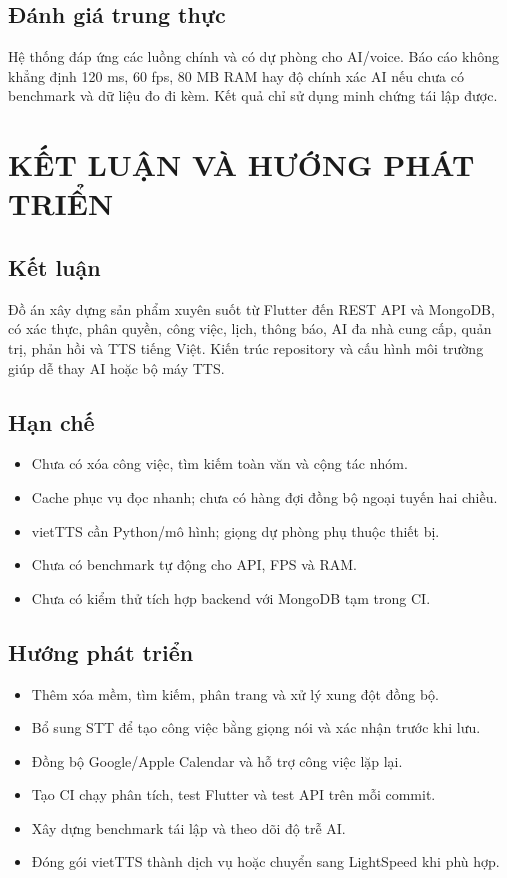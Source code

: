 \documentclass[12pt,a4paper,oneside]{report}
\begin{document}
\section{Đánh giá trung thực}
Hệ thống đáp ứng các luồng chính và có dự phòng cho AI/voice. Báo cáo không khẳng
định 120 ms, 60 fps, 80 MB RAM hay độ chính xác AI nếu chưa có benchmark và dữ liệu
đo đi kèm. Kết quả chỉ sử dụng minh chứng tái lập được.

\chapter{KẾT LUẬN VÀ HƯỚNG PHÁT TRIỂN}
\section{Kết luận}
Đồ án xây dựng sản phẩm xuyên suốt từ Flutter đến REST API và MongoDB, có xác thực,
phân quyền, công việc, lịch, thông báo, AI đa nhà cung cấp, quản trị, phản hồi và TTS
tiếng Việt. Kiến trúc repository và cấu hình môi trường giúp dễ thay AI hoặc bộ máy TTS.

\section{Hạn chế}
\begin{itemize}
 \item Chưa có xóa công việc, tìm kiếm toàn văn và cộng tác nhóm.
 \item Cache phục vụ đọc nhanh; chưa có hàng đợi đồng bộ ngoại tuyến hai chiều.
 \item vietTTS cần Python/mô hình; giọng dự phòng phụ thuộc thiết bị.
 \item Chưa có benchmark tự động cho API, FPS và RAM.
 \item Chưa có kiểm thử tích hợp backend với MongoDB tạm trong CI.
\end{itemize}

\section{Hướng phát triển}
\begin{itemize}
 \item Thêm xóa mềm, tìm kiếm, phân trang và xử lý xung đột đồng bộ.
 \item Bổ sung STT để tạo công việc bằng giọng nói và xác nhận trước khi lưu.
 \item Đồng bộ Google/Apple Calendar và hỗ trợ công việc lặp lại.
 \item Tạo CI chạy phân tích, test Flutter và test API trên mỗi commit.
 \item Xây dựng benchmark tái lập và theo dõi độ trễ AI.
 \item Đóng gói vietTTS thành dịch vụ hoặc chuyển sang LightSpeed khi phù hợp.
\end{itemize}
\end{document}

